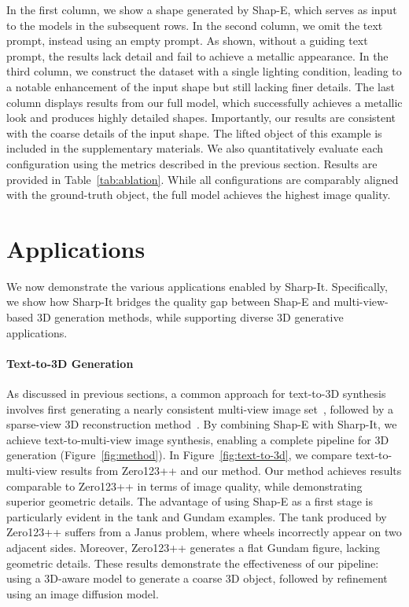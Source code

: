 

In the first column, we show a shape generated by Shap-E, which serves as input to the models in the subsequent rows. In the second column, we omit the text prompt, instead using an empty prompt. As shown, without a guiding text prompt, the results lack detail and fail to achieve a metallic appearance. In the third column, we construct the dataset with a single lighting condition, leading to a notable enhancement of the input shape but still lacking finer details. The last column displays results from our full model, which successfully achieves a metallic look and produces highly detailed shapes. Importantly, our results are consistent with the coarse details of the input shape. The lifted object of this example is included in the supplementary materials.
We also quantitatively evaluate each configuration using the metrics described in the previous section. Results are provided in Table~\ref{tab:ablation}. While all configurations are comparably aligned with the ground-truth object, the full model achieves the highest image quality.



\section{Applications}
We now demonstrate the various applications enabled by Sharp-It. Specifically, we show how Sharp-It bridges the quality gap between Shap-E and multi-view-based 3D generation methods, while supporting diverse 3D generative applications.

\vspace{-16pt}
\paragraph{Text-to-3D Generation}
As discussed in previous sections, a common approach for text-to-3D synthesis involves first generating a nearly consistent multi-view image set~\cite{shi2024mvdream, wang2023imagedream, shi2023zero123singleimageconsistent}, followed by a sparse-view 3D reconstruction method~\cite{xu2024instantmesh}. By combining Shap-E with Sharp-It, we achieve text-to-multi-view image synthesis, enabling a complete pipeline for 3D generation (Figure~\ref{fig:method}).
In Figure~\ref{fig:text-to-3d}, we compare text-to-multi-view results from Zero123++ and our method. Our method achieves results comparable to Zero123++ in terms of image quality, while demonstrating superior geometric details. The advantage of using Shap-E as a first stage is particularly evident in the tank and Gundam examples. The tank produced by Zero123++ suffers from a Janus problem, where wheels incorrectly appear on two adjacent sides. Moreover, Zero123++ generates a flat Gundam figure, lacking geometric details. These results demonstrate the effectiveness of our pipeline: using a 3D-aware model to generate a coarse 3D object, followed by refinement using an image diffusion model.

